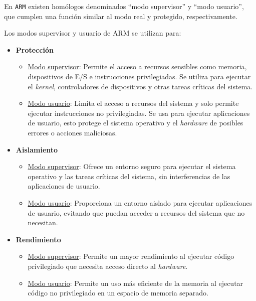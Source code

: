 	
	
	En \texttt{ARM} existen homólogos denominados ``modo supervisor'' y ``modo usuario'', que cumplen una función similar al modo real y protegido, respectivamente.
	
	
	Los modos supervisor y usuario de ARM se utilizan para:
	\begin{itemize} \setlength\itemsep{0pt}
		\item \textbf{Protección}
		\begin{itemize} \setlength\itemsep{0pt}
			\item \underline{Modo supervisor}: Permite el acceso a recursos sensibles como memoria, dispositivos de E/S e instrucciones privilegiadas. Se utiliza para ejecutar el \textit{kernel}, controladores de dispositivos y otras tareas críticas del sistema.
			
			\item \underline{Modo usuario}: Limita el acceso a recursos del sistema y solo permite ejecutar instrucciones no privilegiadas. Se usa para ejecutar aplicaciones de usuario, esto protege el sistema operativo y el \textit{hardware} de posibles errores o acciones maliciosas.
		\end{itemize}
	
		\item \textbf{Aislamiento}
		\begin{itemize} \setlength\itemsep{0pt}
			\item \underline{Modo supervisor}: Ofrece un entorno seguro para ejecutar el sistema operativo y las tareas críticas del sistema, sin interferencias de las aplicaciones de usuario.
			
			\item \underline{Modo usuario}: Proporciona un entorno aislado para ejecutar aplicaciones de usuario, evitando que puedan acceder a recursos del sistema que no necesitan.
		\end{itemize}
	
		\item \textbf{Rendimiento}
		\begin{itemize} \setlength\itemsep{0pt}
			\item \underline{Modo supervisor}: Permite un mayor rendimiento al ejecutar código privilegiado que necesita acceso directo al \textit{hardware}.
			
			\item \underline{Modo usuario}: Permite un uso más eficiente de la memoria al ejecutar código no privilegiado en un espacio de memoria separado.
		\end{itemize}
	\end{itemize}

